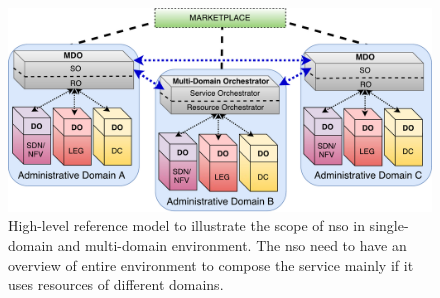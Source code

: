 \begin{figure}[th]
  \centering
  \includegraphics[scale=.6]{Figures/01_Introduction/nso}
    \caption{High-level reference model to illustrate the scope of \acrfull{nso} in single-domain and multi-domain environment. The \gls{nso}  need to have an overview of entire environment to compose the service mainly if it uses resources of different domains.}
    \label{mdo}
\end{figure}






